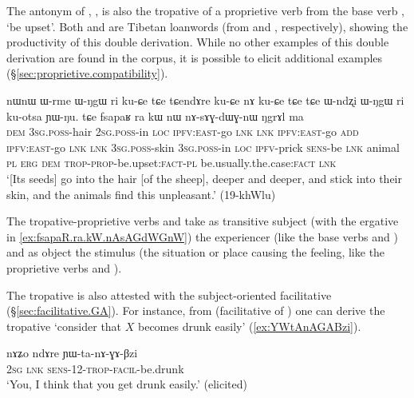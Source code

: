 The antonym of  , , is also the tropative of a proprietive verb  from the base verb , `be upset'. Both  and  are Tibetan loanwords (from  and , respectively), showing the productivity of this double derivation. While no other examples of this double derivation are found in the corpus, it is possible to elicit additional examples (§\ref{sec:proprietive.compatibility}).

\begin{exe}
\ex \label{ex:fsapaR.ra.kW.nAsAGdWGnW}
\gll nɯnɯ ɯ-rme ɯ-ŋgɯ ri ku-ɕe tɕe tɕendɤre ku-ɕe nɤ ku-ɕe tɕe tɕe ɯ-ndʐi ɯ-ŋgɯ ri ku-otsa ɲɯ-ŋu. tɕe fsapaʁ ra kɯ nɯ nɤ-sɤɣ-dɯɣ-nɯ ŋgrɤl ma \\
\textsc{dem} \textsc{3sg}.\textsc{poss}-hair \textsc{2sg}.\textsc{poss}-in \textsc{loc} \textsc{ipfv}:\textsc{east}-go \textsc{lnk} \textsc{lnk} \textsc{ipfv}:\textsc{east}-go \textsc{add} \textsc{ipfv}:\textsc{east}-go \textsc{lnk} \textsc{lnk} \textsc{3sg}.\textsc{poss}-skin \textsc{3sg}.\textsc{poss}-in \textsc{loc} \textsc{ipfv}-prick \textsc{sens}-be \textsc{lnk} animal \textsc{pl} \textsc{erg} \textsc{dem} \textsc{trop}-\textsc{prop}-be.upset:\textsc{fact}-\textsc{pl} be.usually.the.case:\textsc{fact} \textsc{lnk} \\
\glt `[Its seeds] go into the hair [of the sheep], deeper and deeper, and stick into their skin, and the animals find this unpleasant.' (19-khWlu)
\end{exe}

The tropative-proprietive verbs  and  take as transitive subject (with the ergative in \ref{ex:fsapaR.ra.kW.nAsAGdWGnW}) the experiencer (like the base verbs  and ) and as object the stimulus (the situation or place causing the feeling, like the proprietive verbs  and ).

The tropative is also attested with the subject-oriented facilitative  (§\ref{sec:facilitative.GA}). For instance, from  (facilitative of ) one can derive the tropative  `consider that $X$ becomes drunk easily' (\ref{ex:YWtAnAGABzi}).

\begin{exe}
\ex \label{ex:YWtAnAGABzi}
\gll nɤʑo ndɤre ɲɯ-ta-nɤ-ɣɤ-βzi  \\
\textsc{2sg} \textsc{lnk} \textsc{sens}-1\fl{}2-\textsc{trop}-\textsc{facil}-be.drunk \\
\glt `You, I think that you get drunk easily.' (elicited)
\end{exe}

